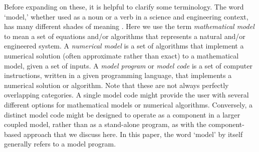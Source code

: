 \documentclass[12pt]{amsart}
\begin{document}
Before expanding on these, it is helpful to clarify some terminology. The word `model,' whether used as a noun or a verb in a science and engineering context, has many different shades of meaning \citep[e.g.,][]{bras2003six}. Here we use the term \textit{mathematical model} to mean a set of equations and/or algorithms that represents a natural and/or engineered system. A \textit{numerical model} is a set of algorithms that implement a numerical solution (often approximate rather than exact) to a mathematical model, given a set of inputs. A \textit{model program} or \textit{model code} is a set of computer instructions, written in a given programming language, that implements a numerical solution or algorithm. Note that these are not always perfectly overlapping categories. A single model code might provide the user with several different options for mathematical models or numerical algorithms. Conversely, a distinct model code might be designed to operate as a component in a larger coupled model, rather than as a stand-alone program, as with the component-based approach that we discuss here. In this paper, the word `model' by itself generally refers to a model program.
\end{document}
